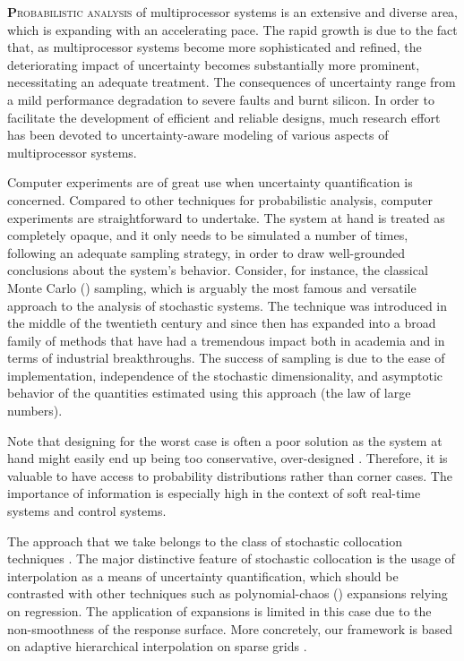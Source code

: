 \lettrine[findent=0.4em, nindent=0em]{\textbf{P}}{robabilistic analysis} of
multiprocessor systems is an extensive and diverse area, which is expanding with
an accelerating pace. The rapid growth is due to the fact that, as
multiprocessor systems become more sophisticated and refined, the deteriorating
impact of uncertainty becomes substantially more prominent, necessitating an
adequate treatment. The consequences of uncertainty range from a mild
performance degradation to severe faults and burnt silicon. In order to
facilitate the development of efficient and reliable designs, much research
effort has been devoted to uncertainty-aware modeling of various aspects of
multiprocessor systems.

Computer experiments \cite{santner2003} are of great use when uncertainty
quantification is concerned. Compared to other techniques for probabilistic
analysis, computer experiments are straightforward to undertake. The system at
hand is treated as completely opaque, and it only needs to be simulated a number
of times, following an adequate sampling strategy, in order to draw
well-grounded conclusions about the system's behavior. Consider, for instance,
the classical Monte Carlo () sampling, which is arguably the most
famous and versatile approach to the analysis of stochastic systems. The
technique was introduced in the middle of the twentieth century and since then
has expanded into a broad family of methods that have had a tremendous impact
both in academia and in terms of industrial breakthroughs. The success of
 sampling is due to the ease of implementation, independence of the
stochastic dimensionality, and asymptotic behavior of the quantities estimated
using this approach (the law of large numbers).

Note that designing for the worst case is often a poor solution as the system at
hand might easily end up being too conservative, over-designed
\cite{quinton2012}. Therefore, it is valuable to have access to probability
distributions rather than corner cases. The importance of information is
especially high in the context of soft real-time systems and control systems.

The approach that we take belongs to the class of stochastic collocation
techniques \cite{xiu2010}. The major distinctive feature of stochastic
collocation is the usage of interpolation as a means of uncertainty
quantification, which should be contrasted with other techniques such as
polynomial-chaos () expansions relying on regression. The application
of  expansions is limited in this case due to the non-smoothness of the
response surface. More concretely, our framework is based on adaptive
hierarchical interpolation on sparse grids \cite{klimke2006, ma2009}.

